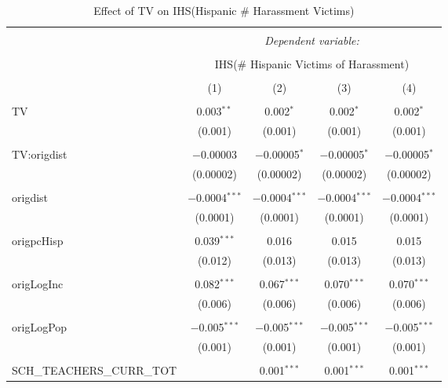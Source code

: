 
\begin{table}[!htbp] \centering 
  \caption{Effect of TV on IHS(Hispanic \# Harassment Victims)} 
  \label{} 
\begin{tabular}{@{\extracolsep{-2pt}}lcccc} 
\\[-1.8ex]\hline 
\hline \\[-1.8ex] 
 & \multicolumn{4}{c}{\textit{Dependent variable:}} \\ 
\cline{2-5} 
\\[-1.8ex] & \multicolumn{4}{c}{IHS(\# Hispanic Victims of Harassment)} \\ 
\\[-1.8ex] & (1) & (2) & (3) & (4)\\ 
\hline \\[-1.8ex] 
 TV & 0.003$^{**}$ & 0.002$^{*}$ & 0.002$^{*}$ & 0.002$^{*}$ \\ 
  & (0.001) & (0.001) & (0.001) & (0.001) \\ 
  & & & & \\ 
 TV:origdist & $-$0.00003 & $-$0.00005$^{*}$ & $-$0.00005$^{*}$ & $-$0.00005$^{*}$ \\ 
  & (0.00002) & (0.00002) & (0.00002) & (0.00002) \\ 
  & & & & \\ 
 origdist & $-$0.0004$^{***}$ & $-$0.0004$^{***}$ & $-$0.0004$^{***}$ & $-$0.0004$^{***}$ \\ 
  & (0.0001) & (0.0001) & (0.0001) & (0.0001) \\ 
  & & & & \\ 
 origpcHisp & 0.039$^{***}$ & 0.016 & 0.015 & 0.015 \\ 
  & (0.012) & (0.013) & (0.013) & (0.013) \\ 
  & & & & \\ 
 origLogInc & 0.082$^{***}$ & 0.067$^{***}$ & 0.070$^{***}$ & 0.070$^{***}$ \\ 
  & (0.006) & (0.006) & (0.006) & (0.006) \\ 
  & & & & \\ 
 origLogPop & $-$0.005$^{***}$ & $-$0.005$^{***}$ & $-$0.005$^{***}$ & $-$0.005$^{***}$ \\ 
  & (0.001) & (0.001) & (0.001) & (0.001) \\ 
  & & & & \\ 
 SCH\_TEACHERS\_CURR\_TOT &  & 0.001$^{***}$ & 0.001$^{***}$ & 0.001$^{***}$ \\ 

\end{tabular}
\end{table}
